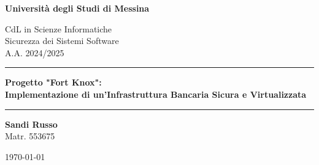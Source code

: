 \documentclass[a4paper, 12pt, titlepage]{article}
\begin{document}
\begin{titlepage}
    \centering
    \vspace*{1cm}

    \Huge\bfseries
    Università degli Studi di Messina

    \vspace{1.5cm}

    \Large
    CdL in Scienze Informatiche \\
    Sicurezza dei Sistemi Software \\
    A.A. 2024/2025

    \vspace{2.5cm}

    \textcolor{blue!70!black}{\rule{\linewidth}{0.4mm}}
    \vspace{0.4cm}
    \Huge\bfseries
    Progetto "Fort Knox": \\ Implementazione di un'Infrastruttura Bancaria Sicura e Virtualizzata
    \vspace{0.4cm}
    \textcolor{blue!70!black}{\rule{\linewidth}{0.4mm}}

    \vspace{2cm}

    \Large
    \textbf{Sandi Russo} \\
    Matr. 553675

    \vfill

    \Large
    \today

\end{titlepage}


\pagestyle{fancy}
\fancyhf{} 
\renewcommand{\headrulewidth}{0pt} 
\renewcommand{\footrule}{\color{blue!70!black}\hrule width \linewidth height 0.4pt}

\cfoot{\color{black!75}\thepage}
\end{document}
